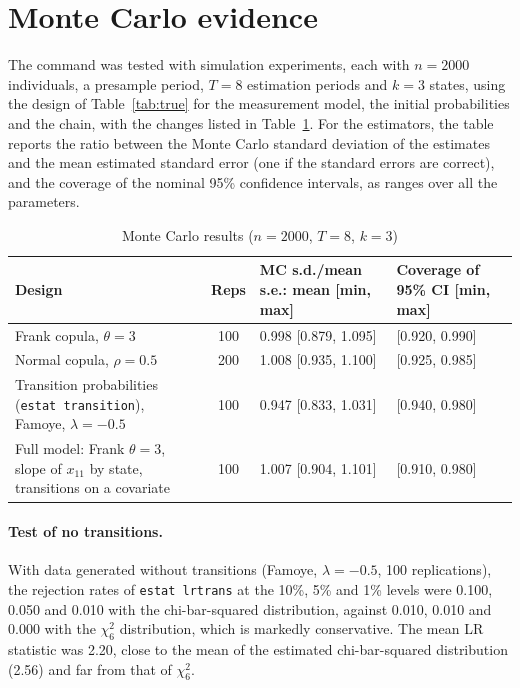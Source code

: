 \documentclass[11pt,a4paper]{article}
\newcommand{\cmd}[1]{\texttt{#1}}
\begin{document}
\section{Monte Carlo evidence}\label{sec:mc}

The command was tested with simulation experiments, each with $n=2000$ individuals, a presample period,
$T=8$ estimation periods and $k=3$ states, using the design of Table~\ref{tab:true} for the
measurement model, the initial probabilities and the chain, with the changes listed in
Table~\ref{tab:mc}. For the estimators, the table reports the ratio between the Monte Carlo standard
deviation of the estimates and the mean estimated standard error (one if the standard errors are
correct), and the coverage of the nominal 95\% confidence intervals, as ranges over all the
parameters.

\begin{table}[h]
\centering\small
\caption{Monte Carlo results ($n=2000$, $T=8$, $k=3$)}\label{tab:mc}
\begin{tabularx}{\textwidth}{>{\raggedright\arraybackslash}p{4.3cm}cXX}
\toprule
Design & Reps & MC s.d./mean s.e.: mean [min, max] & Coverage of 95\% CI [min, max]\\
\midrule
Frank copula, $\theta=3$ & 100 & 0.998 [0.879, 1.095] & [0.920, 0.990]\\
Normal copula, $\rho=0.5$ & 200 & 1.008 [0.935, 1.100] & [0.925, 0.985]\\
Transition probabilities (\cmd{estat transition}), Famoye, $\lambda=-0.5$ & 100 & 0.947 [0.833, 1.031] & [0.940, 0.980]\\
Full model: Frank $\theta=3$, slope of $x_{11}$ by state, transitions on a covariate & 100 & 1.007 [0.904, 1.101] & [0.910, 0.980]\\
\bottomrule
\end{tabularx}
\end{table}

\paragraph{Test of no transitions.} With data generated without transitions (Famoye, $\lambda=-0.5$,
100 replications), the rejection rates of \cmd{estat lrtrans} at the 10\%, 5\% and 1\% levels were
0.100, 0.050 and 0.010 with the chi-bar-squared distribution, against 0.010, 0.010 and 0.000 with the
$\chi^2_6$ distribution, which is markedly conservative. The mean LR statistic was 2.20, close to the
mean of the estimated chi-bar-squared distribution (2.56) and far from that of $\chi^2_6$.
\end{document}

